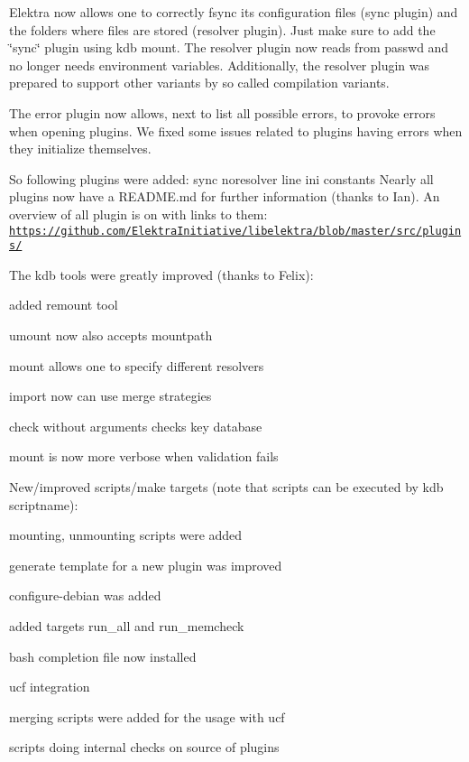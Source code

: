 Elektra now allows one to correctly fsync its configuration files (sync plugin) and the folders where files are stored (resolver plugin). Just make sure to add the \char`\"{}sync\char`\"{} plugin using kdb mount. The resolver plugin now reads from passwd and no longer needs environment variables. Additionally, the resolver plugin was prepared to support other variants by so called compilation variants.

The error plugin now allows, next to list all possible errors, to provoke errors when opening plugins. We fixed some issues related to plugins having errors when they initialize themselves.

So following plugins were added\+: sync noresolver line ini constants Nearly all plugins now have a R\+E\+A\+D\+M\+E.\+md for further information (thanks to Ian). An overview of all plugin is on with links to them\+: \href{https://github.com/ElektraInitiative/libelektra/blob/master/src/plugins/}{\tt https\+://github.\+com/\+Elektra\+Initiative/libelektra/blob/master/src/plugins/}

The kdb tools were greatly improved (thanks to Felix)\+:


\begin{DoxyItemize}
\item added remount tool
\item umount now also accepts mountpath
\item mount allows one to specify different resolvers
\item import now can use merge strategies
\item check without arguments checks key database
\item mount is now more verbose when validation fails
\end{DoxyItemize}

New/improved scripts/make targets (note that scripts can be executed by kdb scriptname)\+:


\begin{DoxyItemize}
\item mounting, unmounting scripts were added
\item generate template for a new plugin was improved
\item configure-\/debian was added
\item added targets {\ttfamily run\+\_\+all} and {\ttfamily run\+\_\+memcheck}
\item bash completion file now installed
\item ucf integration
\item merging scripts were added for the usage with ucf
\item scripts doing internal checks on source of plugins
\end{DoxyItemize}

